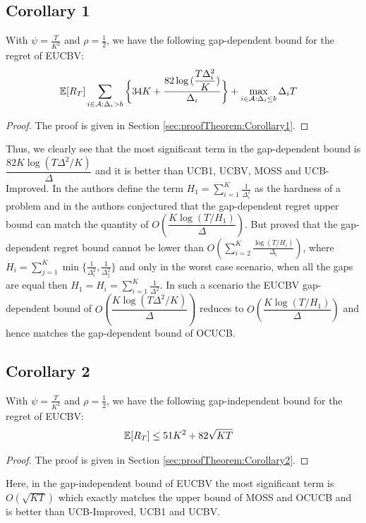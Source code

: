 \subsection{Corollary 1}
\begin{corollary}
\label{Result:Corollary:1}
With $\psi=\frac{T}{K^2}$ and $\rho=\frac{1}{2}$, we have the following gap-dependent bound for the regret of EUCBV:
\begin{align*}
\mathbb{E} [R_T] & \sum_{i\in \mathcal{A}:\Delta_{i} > b}\bigg\lbrace 34 K + \dfrac{82\log{(\dfrac{T\Delta_{i}^{2}}{ K})}}{\Delta_{i}}\bigg\rbrace 
 + \max\limits_{i\in \mathcal{A}:\Delta_{i}\leq b}\Delta_{i}T 
	\end{align*} 
\end{corollary}
\begin{proof}
The proof is given in Section \ref{sec:proofTheorem:Corollary1}.
\end{proof}
Thus, we clearly see that the most significant term in the gap-dependent bound is $\dfrac{82K\log{(T\Delta^{2}/K)}}{\Delta}$ and it is better than UCB1, UCBV, MOSS and UCB-Improved. In \citet{audibert2010best} the authors define the term $H_1=\sum_{i=1}^{K}\frac{1}{\Delta_i^2}$ as the hardness of a problem and in \citet{bubeck2012regret} the authors conjectured that the gap-dependent regret upper bound can match the quantity of $O\left(\dfrac{K\log{(T/H_1)}}{\Delta}\right)$. But \citet{lattimore2015optimally} proved that the gap-dependent regret bound cannot be lower than $O\left(\sum_{i=2}^{K}\frac{\log\left(T/H_i\right)}{\Delta_i}\right)$, where $H_i=\sum_{j=1}^{K}\min\lbrace \frac{1}{\Delta_i^2},\frac{1}{\Delta_j^2}\rbrace$ and only in the worst case scenario, when all the gaps are equal then $H_1=H_{i}=\sum_{i=1}^{K}\frac{1}{\Delta^2}$. In such a scenario the EUCBV gap-dependent bound of $O\left(\dfrac{K\log{(T\Delta^{2}/ K)}}{\Delta}\right)$ reduces to $O\left(\dfrac{K\log{(T/H_1)}}{\Delta}\right)$ and hence matches the gap-dependent bound of OCUCB.

\subsection{Corollary 2}

\begin{corollary}
\label{Result:Corollary:2}
With $\psi=\frac{T}{K^2}$ and $\rho=\frac{1}{2}$, we have the following gap-independent bound for the regret of EUCBV:
\begin{align*}
\mathbb{E}[R_{T}] & \leq 51 K^2 + 82\sqrt{KT}
	\end{align*} 
\end{corollary}
\begin{proof}
The proof is given in Section \ref{sec:proofTheorem:Corollary2}.
\end{proof}
Here, in the gap-independent bound of EUCBV the most significant term is $O\left(\sqrt{KT}\right)$ which exactly matches the upper bound of MOSS and OCUCB and is better than UCB-Improved, UCB1 and UCBV.